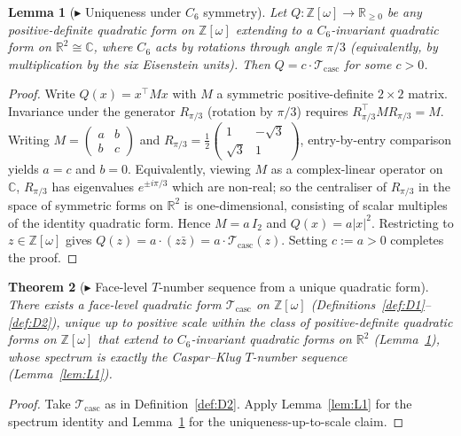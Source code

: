 \documentclass[12pt]{article}
\newtheorem{theorem}{Theorem}
\newtheorem{lemma}[theorem]{Lemma}
\newcommand{\Tcasc}{\mathcal{T}_{\mathrm{casc}}}
\newcommand{\Zom}{\mathbb{Z}[\omega]}
\begin{document}
\begin{lemma}[$\blacktriangleright$ Uniqueness under $C_6$ symmetry]\label{lem:L3}
Let $Q : \Zom \to \mathbb{R}_{\ge 0}$ be any positive-definite quadratic
form on $\Zom$ extending to a $C_6$-invariant quadratic form on
$\mathbb{R}^2 \cong \mathbb{C}$, where $C_6$ acts by rotations through
angle $\pi/3$ (equivalently, by multiplication by the six Eisenstein
units). Then $Q = c \cdot \Tcasc$ for some $c > 0$.
\end{lemma}

\begin{proof}
Write $Q(x) = x^\top M x$ with $M$ a symmetric positive-definite
$2\times 2$ matrix. Invariance under the generator $R_{\pi/3}$
(rotation by $\pi/3$) requires $R_{\pi/3}^\top M R_{\pi/3} = M$.
Writing $M = \begin{pmatrix} a & b \\ b & c\end{pmatrix}$ and
$R_{\pi/3} = \tfrac{1}{2}\begin{pmatrix} 1 & -\sqrt{3} \\ \sqrt{3} & 1 \end{pmatrix}$,
entry-by-entry comparison yields $a = c$ and $b = 0$. Equivalently,
viewing $M$ as a complex-linear operator on $\mathbb{C}$, $R_{\pi/3}$
has eigenvalues $e^{\pm i\pi/3}$ which are non-real; so the
centraliser of $R_{\pi/3}$ in the space of symmetric forms on
$\mathbb{R}^2$ is one-dimensional, consisting of scalar multiples of
the identity quadratic form. Hence $M = a\,I_2$ and $Q(x) = a|x|^2$.
Restricting to $z \in \Zom$ gives $Q(z) = a \cdot (z\bar{z}) =
a\cdot \Tcasc(z)$. Setting $c := a > 0$ completes the proof.
\end{proof}

\begin{theorem}[$\blacktriangleright$ Face-level $T$-number sequence from a unique quadratic form]\label{thm:T1}
There exists a face-level quadratic form $\Tcasc$ on $\Zom$
(Definitions~\ref{def:D1}--\ref{def:D2}), unique up to positive scale
within the class of positive-definite quadratic forms on $\Zom$ that
extend to $C_6$-invariant quadratic forms on $\mathbb{R}^2$
(Lemma~\ref{lem:L3}), whose spectrum is exactly the Caspar--Klug
$T$-number sequence (Lemma~\ref{lem:L1}).
\end{theorem}

\begin{proof}
Take $\Tcasc$ as in Definition~\ref{def:D2}. Apply Lemma~\ref{lem:L1}
for the spectrum identity and Lemma~\ref{lem:L3} for the
uniqueness-up-to-scale claim.
\end{proof}
\end{document}
